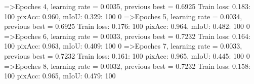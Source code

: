 =>Epoches 4, learning rate = 0.0035,                 previous best = 0.6925
Train loss: 0.183: 100%
pixAcc: 0.960, mIoU: 0.329: 100%
  0%
=>Epoches 5, learning rate = 0.0034,                 previous best = 0.6925
Train loss: 0.176: 100%
pixAcc: 0.964, mIoU: 0.482: 100%
  0%
=>Epoches 6, learning rate = 0.0033,                 previous best = 0.7232
Train loss: 0.164: 100%
pixAcc: 0.963, mIoU: 0.409: 100%
  0%
=>Epoches 7, learning rate = 0.0033,                 previous best = 0.7232
Train loss: 0.161: 100%
pixAcc: 0.965, mIoU: 0.445: 100%
  0%
=>Epoches 8, learning rate = 0.0032,                 previous best = 0.7232
Train loss: 0.158: 100%
pixAcc: 0.965, mIoU: 0.479: 100%
